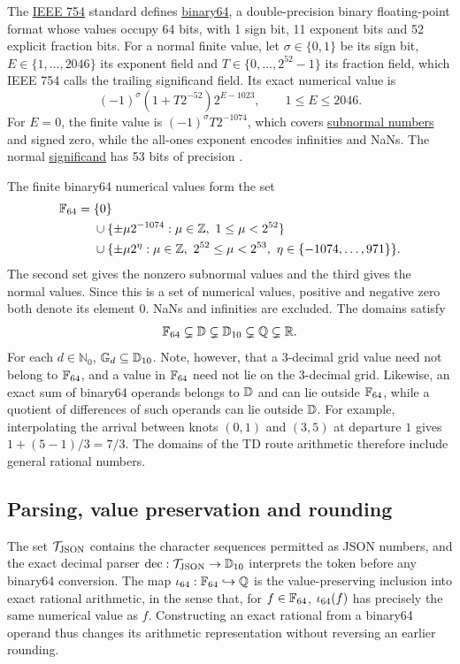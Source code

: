 The \href{https://en.wikipedia.org/wiki/IEEE_754}{IEEE 754} standard defines \href{https://en.wikipedia.org/wiki/Double-precision_floating-point_format}{binary64}, a double-precision binary floating-point format whose values occupy 64 bits, with 1 sign bit, 11 exponent bits and 52 explicit fraction bits. For a normal finite value, let $\sigma\in\{0,1\}$ be its sign bit, $E\in\{1,\ldots,2046\}$ its exponent field and $T\in\{0,\ldots,2^{52}-1\}$ its fraction field, which IEEE 754 calls the trailing significand field. Its exact numerical value is
\begin{equation}\label{eq:binary64-normal}
(-1)^{\sigma}(1+T2^{-52})2^{E-1023},\qquad 1\leq E\leq2046.
\end{equation}
For $E=0$, the finite value is $(-1)^{\sigma}T2^{-1074}$, which covers \href{https://en.wikipedia.org/wiki/Subnormal_number}{subnormal numbers} and signed zero, while the all-ones exponent encodes infinities and NaNs. The normal \href{https://en.wikipedia.org/wiki/Significand}{significand} has 53 bits of precision \autocite{oracleIEEEArithmetic}.

The finite binary64 numerical values form the set
\begin{align}
\Fbin={}&\{0\}\nonumber\\
&\cup\{\pm\mu2^{-1074}:\mu\in\mathbb{Z},\ 1\leq\mu<2^{52}\}\nonumber\\
&\cup\{\pm\mu2^{\eta}:\mu\in\mathbb{Z},\ 2^{52}\leq\mu<2^{53},\ \eta\in\{-1074,\ldots,971\}\}.
\end{align}
The second set gives the nonzero subnormal values and the third gives the normal values. Since this is a set of numerical values, positive and negative zero both denote its element 0. NaNs and infinities are excluded. The domains satisfy
\begin{equation}
\mathbb{F}_{64}\subsetneq\mathbb{D}\subsetneq\mathbb{D}_{10}\subsetneq\mathbb{Q}\subsetneq\mathbb{R}.
\end{equation}
For each $d\in\mathbb{N}_0$, $\mathbb{G}_{d}\subseteq\mathbb{D}_{10}$. Note, however, that a 3-decimal grid value need not belong to $\mathbb{F}_{64}$, and a value in $\mathbb{F}_{64}$ need not lie on the 3-decimal grid. Likewise, an exact sum of binary64 operands belongs to $\mathbb{D}$ and can lie outside $\mathbb{F}_{64}$, while a quotient of differences of such operands can lie outside $\mathbb{D}$. For example, interpolating the arrival between knots $(0,1)$ and $(3,5)$ at departure $1$ gives $1+(5-1)/3=7/3$. The domains of the TD route arithmetic therefore include general rational numbers.

\subsection{Parsing, value preservation and rounding}
The set $\mathcal{T}_{\mathrm{JSON}}$ contains the character sequences permitted as JSON numbers, and the exact decimal parser $\operatorname{dec}:\mathcal{T}_{\mathrm{JSON}}\to\mathbb{D}_{10}$ interprets the token before any binary64 conversion. The map $\iota_{64}:\mathbb{F}_{64}\hookrightarrow\mathbb{Q}$ is the value-preserving inclusion into exact rational arithmetic, in the sense that, for $f\in\mathbb{F}_{64}$, $\iota_{64}(f)$ has precisely the same numerical value as $f$. Constructing an exact rational from a binary64 operand thus changes its arithmetic representation without reversing an earlier rounding.

